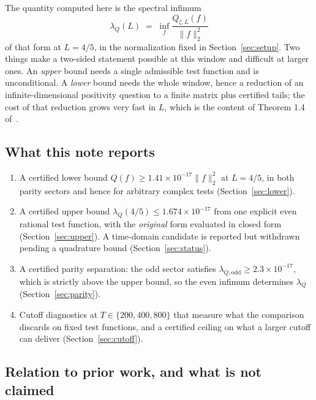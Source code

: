 \documentclass[11pt,a4paper]{article}
\theoremstyle{definition}
\theoremstyle{remark}
\newcommand{\lQ}{\lambda_{Q}}
\begin{document}
The quantity computed here is the spectral infimum
\[
   \lQ(L) \;=\; \inf_{f} \frac{Q_{\zeta,L}(f)}{\|f\|_2^2}
\]
of that form at $L = 4/5$, in the normalization fixed in
Section~\ref{sec:setup}. Two things make a two-sided statement possible at this
window and difficult at larger ones. An \emph{upper} bound needs a single
admissible test function and is unconditional. A \emph{lower} bound needs the
whole window, hence a reduction of an infinite-dimensional positivity question
to a finite matrix plus certified tails; the cost of that reduction grows very
fast in $L$, which is the content of Theorem 1.4 of~\cite{Zhu}.

\subsection{What this note reports}

\begin{enumerate}
\item A certified lower bound $Q(f) \ge 1.41\times10^{-17}\|f\|_2^2$ at
  $L = 4/5$, in both parity sectors and hence for arbitrary complex tests
  (Section~\ref{sec:lower}).
\item A certified upper bound $\lQ(4/5) \le 1.674\times10^{-17}$ from one
  explicit even rational test function, with the \emph{original} form evaluated
  in closed form (Section~\ref{sec:upper}). A time-domain candidate is reported
  but withdrawn pending a quadrature bound (Section~\ref{sec:status}).
\item A certified parity separation: the odd sector satisfies
  $\lambda_{Q,\mathrm{odd}} \ge 2.3\times10^{-17}$, which is strictly above the
  upper bound, so the even infimum determines $\lQ$
  (Section~\ref{sec:parity}).
\item Cutoff diagnostics at $T \in \{200,400,800\}$ that measure what the
  comparison discards on fixed test functions, and a certified ceiling on what
  a larger cutoff can deliver (Section~\ref{sec:cutoff}).
\end{enumerate}

\subsection{Relation to prior work, and what is not claimed}
\label{sec:prior}
\end{document}
